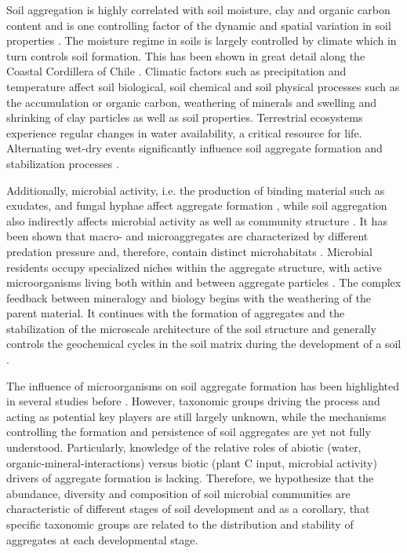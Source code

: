 Soil aggregation is highly correlated with soil moisture, clay and organic carbon content \citep{AlKaisi2014} and is one controlling factor of the dynamic and spatial variation in soil properties \citep{Totsche2018}. The moisture regime in soils is largely controlled by climate which in turn controls soil formation. This has been shown in great detail along the Coastal Cordillera of Chile \citep{Bernhard2018b}. Climatic factors such as precipitation and temperature affect soil biological, soil chemical and soil physical processes such as the accumulation or organic carbon, weathering of minerals and swelling and shrinking of clay particles as well as soil properties. Terrestrial ecosystems experience regular changes in water availability, a critical resource for life. Alternating wet-dry events significantly influence soil aggregate formation and stabilization processes \citep{Najera2020}.

Additionally, microbial activity, i.e. the production of binding material such as exudates, and fungal hyphae affect aggregate formation \citep{Tisdall1982}, while soil aggregation also indirectly affects microbial activity as well as community structure \citep{Biesgen2020}. It has been shown that macro- and microaggregates are characterized by different predation pressure and, therefore, contain distinct microhabitats \citep{Fox2018, Mummey2004, Sessitsch2001}. Microbial residents occupy specialized niches within the aggregate structure, with active microorganisms living both within and between aggregate particles \citep{Bailey2013, Ebrahimi2016, Sessitsch2001}. The complex feedback between mineralogy and biology begins with the weathering of the parent material. It continues with the formation of aggregates and the stabilization of the microscale architecture of the soil structure and generally controls the geochemical cycles in the soil matrix during the development of a soil \citep{Crawford2012, Lynch1985}.

The influence of microorganisms on soil aggregate formation has been highlighted in several studies before \citep{Chotte2005, Gupta2015, Tisdall1982}. However, taxonomic groups driving the process and acting as potential key players are still largely unknown, while the mechanisms controlling the formation and persistence of soil aggregates are yet not fully understood. Particularly, knowledge of the relative roles of abiotic (water, organic-mineral-interactions) versus biotic (plant C input, microbial activity) drivers of aggregate formation is lacking. Therefore, we hypothesize that the abundance, diversity and composition of soil microbial communities are characteristic of different stages of soil development and as a corollary, that specific taxonomic groups are related to the distribution and stability of aggregates at each developmental stage.

